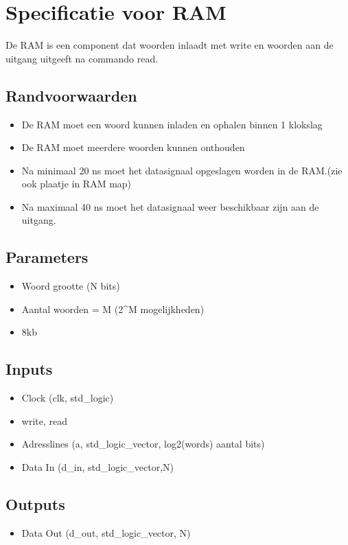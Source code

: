 \documentclass{article}
\begin{document}
\section{Specificatie voor RAM}
De RAM is een component dat woorden inlaadt met write en woorden aan de uitgang uitgeeft na commando read. 
\subsection{Randvoorwaarden}
\begin{itemize}
\item De RAM moet een woord kunnen inladen en ophalen binnen 1 klokslag
\item De RAM moet meerdere woorden kunnen onthouden
\item Na minimaal 20 ns moet het datasignaal opgeslagen worden in de RAM.(zie ook plaatje in RAM map)
\item Na maximaal 40 ns moet het datasignaal weer beschikbaar zijn aan de uitgang.
\end{itemize}
\subsection{Parameters}
\begin{itemize}
\item Woord grootte (N bits)
\item Aantal woorden = M (2^M mogelijkheden)
\item 8kb

\end{itemize}
\subsection{Inputs}
\begin{itemize}
\item Clock (clk, std\_logic)
\item write, read
\item Adresslines (a, std\_logic\_vector, log2(words) aantal bits)
\item Data In (d\_in, std\_logic\_vector,N)
\end{itemize}
\subsection{Outputs}
\begin{itemize}
\item Data Out (d\_out, std\_logic\_vector, N)
\end{itemize}
\end{document}
